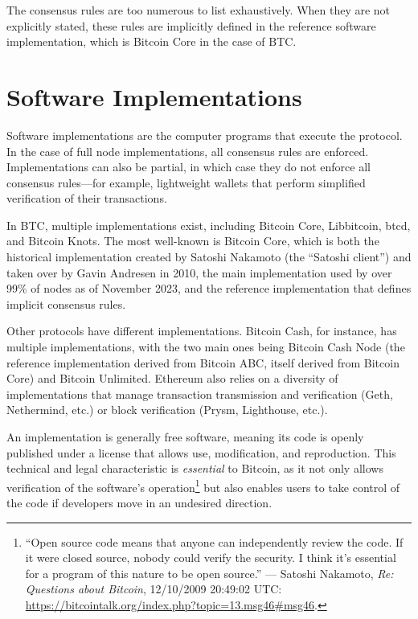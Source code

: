 \documentclass[
  a5paper,
  smalldemyvopaper,10pt,twoside,onecolumn,openright,extrafontsizes,hidelinks]{memoir}
\begin{document}
The consensus rules are too numerous to list exhaustively. When they are
not explicitly stated, these rules are implicitly defined in the
reference software implementation, which is Bitcoin Core in the case of
BTC.

\section*{Software Implementations}\label{software-implementations}


Software implementations are the computer programs that execute the
protocol. In the case of full node implementations, all consensus rules
are enforced. Implementations can also be partial, in which case they do
not enforce all consensus rules---for example, lightweight wallets that
perform simplified verification of their transactions.

In BTC, multiple implementations exist, including Bitcoin Core,
Libbitcoin, btcd, and Bitcoin Knots. The most well-known is Bitcoin
Core, which is both the historical implementation created by Satoshi
Nakamoto (the ``Satoshi client'') and taken over by Gavin Andresen in
2010, the main implementation used by over 99\% of nodes as of November
2023, and the reference implementation that defines implicit consensus
rules.

Other protocols have different implementations. Bitcoin Cash, for
instance, has multiple implementations, with the two main ones being
Bitcoin Cash Node (the reference implementation derived from Bitcoin
ABC, itself derived from Bitcoin Core) and Bitcoin Unlimited. Ethereum
also relies on a diversity of implementations that manage transaction
transmission and verification (Geth, Nethermind, etc.) or block
verification (Prysm, Lighthouse, etc.).

An implementation is generally free software, meaning its code is openly
published under a license that allows use, modification, and
reproduction. This technical and legal characteristic is
\emph{essential} to Bitcoin, as it not only allows verification of the
software's operation\footnote{``Open source code means that anyone can
  independently review the code. If it were closed source, nobody could
  verify the security. I think it's essential for a program of this
  nature to be open source.'' --- Satoshi Nakamoto, \emph{Re: Questions
  about Bitcoin}, 12/10/2009 20:49:02 UTC:
  \url{https://bitcointalk.org/index.php?topic=13.msg46\#msg46}.} but
also enables users to take control of the code if developers move in an
undesired direction.
\end{document}
